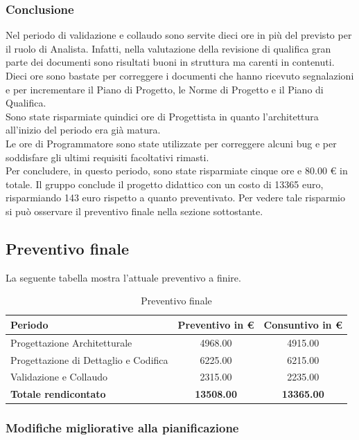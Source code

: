\subsubsection{Conclusione}
Nel periodo di validazione e collaudo sono servite dieci ore in più del previsto per il ruolo di Analista. Infatti, nella valutazione della revisione di qualifica gran parte dei documenti sono risultati buoni in struttura ma carenti in contenuti. Dieci ore sono bastate per correggere i documenti che hanno ricevuto segnalazioni e per incrementare il Piano di Progetto, le Norme di Progetto e il Piano di Qualifica.  \\
Sono state risparmiate quindici ore di Progettista in quanto l'architettura all'inizio del periodo era già matura.\\
Le ore di Programmatore sono state utilizzate per correggere alcuni bug e per soddisfare gli ultimi requisiti facoltativi rimasti.\\
Per concludere, in questo periodo, sono state risparmiate cinque ore e 80.00 € in totale. Il gruppo conclude il progetto didattico con un costo di 13365 euro, risparmiando 143 euro rispetto a quanto preventivato. Per vedere tale risparmio si può osservare il preventivo finale nella sezione sottostante.
\newpage

\subsection{Preventivo finale} \label{preventivo2}
La seguente tabella mostra l'attuale preventivo a finire.

\begin{table}[htbp]
\centering
\begin{tabular}{| l | c  c |}
\hline
\textbf{Periodo} & \textbf{Preventivo in €} & \textbf{Consuntivo in €} \\
\hline
Progettazione Architetturale & 4968.00 & 4915.00\\
Progettazione di Dettaglio e Codifica & 6225.00 & 6215.00\\
Validazione e Collaudo & 2315.00 & 2235.00\\
\hline
\textbf{Totale rendicontato} & \textbf{13508.00} & \textbf{13365.00}\\
\hline
\end{tabular}
\caption[Preventivo finale]{Preventivo finale}
\end{table}

\subsubsection{Modifiche migliorative alla pianificazione} \label{modificheMigliorative}

